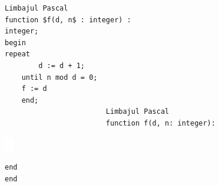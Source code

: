 \documentclass[10pt]{article}
\begin{document}
\begin{verbatim}
Limbajul Pascal
function $f(d, n$ : integer) :
integer;
begin
repeat
        d := d + 1;
    until n mod d = 0;
    f := d
    end;
                        Limbajul Pascal
                        function f(d, n: integer):
\end{verbatim}

\begin{center}
\includegraphics[max width=\textwidth]{2025_04_17_46e04c6acd873ea9558dg-155(1)}
\end{center}

\begin{verbatim}
end
end
\end{verbatim}
\end{document}
